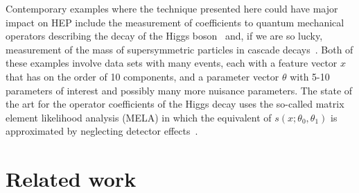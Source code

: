 \documentclass[12pt]{article}
\numberwithin{equation}{section}
\theoremstyle{plain}
\begin{document}
Contemporary examples where the technique presented here could have major impact on HEP include the measurement of coefficients to quantum mechanical operators describing the decay of the Higgs boson~\citep{Chen:2014pia} and, if we are so lucky, measurement of the mass of supersymmetric particles in cascade decays~\citep{Allanach:2000kt}.  Both of these examples involve data sets with many events, each with a feature vector $x$ that has on the order of 10 components, and a parameter vector $\theta$ with 5-10 parameters of interest and possibly many more nuisance parameters.
The state of the art for the operator coefficients of the Higgs decay uses the so-called matrix element likelihood analysis (MELA) in which the equivalent of $s(x; \theta_0, \theta_1)$ is approximated by neglecting detector effects~\citep{Gao:2010qx,Bolognesi:2012mm}.

\bigskip

\section{Related work}\label{S:Related}
\end{document}
